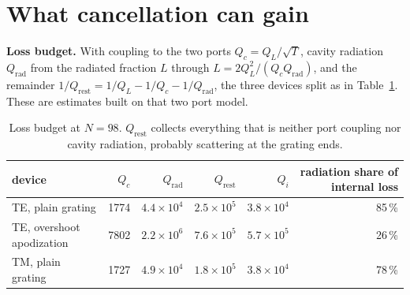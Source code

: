 \documentclass[11pt]{article}
\begin{document}
\section{What cancellation can gain}
\textbf{Loss budget.} With coupling to the two ports $Q_c=Q_L/\sqrt T$, cavity radiation $Q_\mathrm{rad}$ from the radiated fraction $L$ through $L=2Q_L^2/(Q_cQ_\mathrm{rad})$, and the remainder $1/Q_\mathrm{rest}=1/Q_L-1/Q_c-1/Q_\mathrm{rad}$, the three devices split as in Table~\ref{tab:budget}. These are estimates built on that two port model.

\begin{table}[H]
\centering\small
\begin{tabular}{lrrrrr}
\toprule
device & $Q_c$ & $Q_\mathrm{rad}$ & $Q_\mathrm{rest}$ & $Q_i$ & radiation share of internal loss \\
\midrule
TE, plain grating & 1774 & $4.4\times10^4$ & $2.5\times10^5$ & $3.8\times10^4$ & 85\,\% \\
TE, overshoot apodization & 7802 & $2.2\times10^6$ & $7.6\times10^5$ & $5.7\times10^5$ & 26\,\% \\
TM, plain grating & 1727 & $4.9\times10^4$ & $1.8\times10^5$ & $3.8\times10^4$ & 78\,\% \\
\bottomrule
\end{tabular}
\caption{Loss budget at $N=98$. $Q_\mathrm{rest}$ collects everything that is neither port coupling nor cavity radiation, probably scattering at the grating ends.}
\label{tab:budget}
\end{table}
\end{document}
